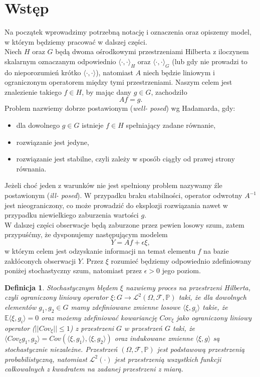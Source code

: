 \documentclass{article}
\newtheorem{df}{Definicja}
\begin{document}
\section{Wstęp}
Na początek wprowadzimy potrzebną notację i oznaczenia oraz opiszemy model, w którym będziemy pracować w dalszej części.\\
Niech $H$ oraz $G$ będą dwoma ośrodkowymi przestrzeniami Hilberta z iloczynem skalarnym oznaczanym odpowiednio $\langle \cdot,\cdot \rangle_H$ oraz $\langle \cdot,\cdot \rangle_G$ (lub gdy nie prowadzi to do nieporozumień krótko $\langle \cdot,\cdot \rangle$), natomiast $A$ niech będzie liniowym i ograniczonym operatorem między tymi przestrzeniami. Naszym celem jest znalezienie takiego $f\in H$, by mając dany $g\in G$, zachodziło
\begin{displaymath}
Af=g.
\end{displaymath}
Problem nazwiemy dobrze postawionym (\textit{well- posed}) wg Hadamarda, gdy:
\begin{itemize}
\item dla dowolnego $g\in G$ istnieje $f\in H$ spełniający zadane równanie,
\item rozwiązanie jest jedyne,
\item rozwiązanie jest stabilne, czyli zależy w sposób ciągły od prawej strony równania.
\end{itemize}
Jeżeli choć jeden z warunków nie jest spełniony problem nazywamy źle postawionym (\textit{ill- posed}). W przypadku braku stabilności, operator odwrotny $A^{-1}$ jest nieograniczony, co może prowadzić do eksplozji rozwiązania nawet w przypadku niewielkiego zaburzenia wartości $g$.\\
W dalszej części obserwacje będą zaburzone przez pewien losowy szum, zatem przypuśćmy, że dysponujemy następującym modelem 
\begin{equation}
Y=Af+\epsilon\xi,
\end{equation}
w którym celem jest odzyskanie informacji na temat elementu $f$ na bazie zakłóconych obserwacji $Y$. Przez $\xi$ rozumieć będziemy odpowiednio zdefiniowany poniżej stochastyczny szum, natomiast przez $\epsilon>0$ jego poziom.
\begin{df}
Stochastycznym błędem $\xi$ nazwiemy proces na przestrzeni Hilberta, czyli ograniczony liniowy operator $\xi\colon G\to \mathcal{L}^2(\Omega, \mathcal{F},\mathbb{P})$ taki, że dla dowolnych elementów $g_1,g_2\in G$ mamy zdefiniowane zmienne losowe $\langle \xi, g_i\rangle$ takie, że $\mathbb{E}\langle \xi, g_i\rangle =0$ oraz możemy zdefiniować kowariancję $Cov_{\xi}$ jako ograniczony liniowy operator ($||Cov_{\xi}||\leq 1$) z przestrzeni $G$ w przestrzeń $G$ taki, że $ \langle Cov_{\xi}g_1,g_2\rangle=Cov(\langle \xi,g_1\rangle,\langle \xi,g_2\rangle)$ oraz indukowane zmienne $\langle \xi, g\rangle$ są stochastycznie niezależne. Przestrzeń $(\Omega, \mathcal{F},\mathbb{P})$ jest podstawową przestrzenią probabilistyczną, natomiast  $\mathcal{L}^2(\cdot)$ jest przestrzenią wszystkich funkcji całkowalnych z kwadratem na zadanej przestrzeni z miarą.
\end{df}
\end{document}
